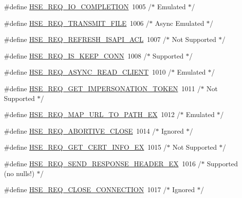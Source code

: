 \begin{DoxyCompactItemize}
\item 
\#define \hyperlink{group__MOD__ISAPI_gade027e54ffcb4c2330ccd46f84040e9c}{H\+S\+E\+\_\+\+R\+E\+Q\+\_\+\+I\+O\+\_\+\+C\+O\+M\+P\+L\+E\+T\+I\+ON}~1005 /$\ast$ Emulated $\ast$/
\item 
\#define \hyperlink{group__MOD__ISAPI_gaac65e72cb9a456e13c052f16e9fda8a3}{H\+S\+E\+\_\+\+R\+E\+Q\+\_\+\+T\+R\+A\+N\+S\+M\+I\+T\+\_\+\+F\+I\+LE}~1006 /$\ast$ Async Emulated $\ast$/
\item 
\#define \hyperlink{group__MOD__ISAPI_gaf74b8d0df1dbdda867e35c5b65429410}{H\+S\+E\+\_\+\+R\+E\+Q\+\_\+\+R\+E\+F\+R\+E\+S\+H\+\_\+\+I\+S\+A\+P\+I\+\_\+\+A\+CL}~1007 /$\ast$ Not Supported $\ast$/
\item 
\#define \hyperlink{group__MOD__ISAPI_gac6b9119e87478e7913e4f13f7709b208}{H\+S\+E\+\_\+\+R\+E\+Q\+\_\+\+I\+S\+\_\+\+K\+E\+E\+P\+\_\+\+C\+O\+NN}~1008 /$\ast$ Supported $\ast$/
\item 
\#define \hyperlink{group__MOD__ISAPI_ga23cf82766f518016618791be3e7e5806}{H\+S\+E\+\_\+\+R\+E\+Q\+\_\+\+A\+S\+Y\+N\+C\+\_\+\+R\+E\+A\+D\+\_\+\+C\+L\+I\+E\+NT}~1010 /$\ast$ Emulated $\ast$/
\item 
\#define \hyperlink{group__MOD__ISAPI_ga5971ebdab749ae38379daa9d4331e529}{H\+S\+E\+\_\+\+R\+E\+Q\+\_\+\+G\+E\+T\+\_\+\+I\+M\+P\+E\+R\+S\+O\+N\+A\+T\+I\+O\+N\+\_\+\+T\+O\+K\+EN}~1011 /$\ast$ Not Supported $\ast$/
\item 
\#define \hyperlink{group__MOD__ISAPI_ga4e278aa8072a706cc0653b2c59248fe1}{H\+S\+E\+\_\+\+R\+E\+Q\+\_\+\+M\+A\+P\+\_\+\+U\+R\+L\+\_\+\+T\+O\+\_\+\+P\+A\+T\+H\+\_\+\+EX}~1012 /$\ast$ Emulated $\ast$/
\item 
\#define \hyperlink{group__MOD__ISAPI_ga0517006df701cbfc8202602c5979cf1b}{H\+S\+E\+\_\+\+R\+E\+Q\+\_\+\+A\+B\+O\+R\+T\+I\+V\+E\+\_\+\+C\+L\+O\+SE}~1014 /$\ast$ Ignored $\ast$/
\item 
\#define \hyperlink{group__MOD__ISAPI_gaa1180b7af43a1fc879523b48f0830e69}{H\+S\+E\+\_\+\+R\+E\+Q\+\_\+\+G\+E\+T\+\_\+\+C\+E\+R\+T\+\_\+\+I\+N\+F\+O\+\_\+\+EX}~1015 /$\ast$ Not Supported $\ast$/
\item 
\#define \hyperlink{group__MOD__ISAPI_ga645c9395b365b1a0b42a5a989767626f}{H\+S\+E\+\_\+\+R\+E\+Q\+\_\+\+S\+E\+N\+D\+\_\+\+R\+E\+S\+P\+O\+N\+S\+E\+\_\+\+H\+E\+A\+D\+E\+R\+\_\+\+EX}~1016 /$\ast$ Supported (no nulls!) $\ast$/
\item 
\#define \hyperlink{group__MOD__ISAPI_ga5ca232dbad97da9c2302bb6c2e165e67}{H\+S\+E\+\_\+\+R\+E\+Q\+\_\+\+C\+L\+O\+S\+E\+\_\+\+C\+O\+N\+N\+E\+C\+T\+I\+ON}~1017 /$\ast$ Ignored $\ast$/

\end{DoxyCompactItemize}

